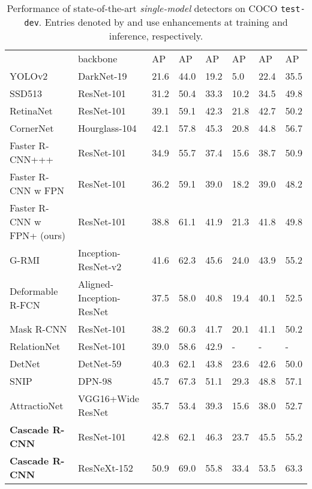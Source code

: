 \documentclass[10pt,journal,compsoc]{IEEEtran}
\newcommand{\bd}[1]{\textbf{#1}}
\newcommand{\tablestyle}[2]{\setlength{\tabcolsep}{#1}\renewcommand{\arraystretch}{#2}\centering\footnotesize}
\begin{document}
\begin{table*}[t]
\tablestyle{3.5pt}{1.1}
\begin{tabular}{l|l|x{22}x{22}x{22}|x{22}x{22}x{22}}
&backbone &AP &AP &AP  &AP &AP &AP\\\shline
YOLOv2 \cite{DBLP:conf/cvpr/RedmonDGF16}       &DarkNet-19 &21.6 &44.0 &19.2  &5.0 &22.4 &35.5\\
SSD513 \cite{DBLP:conf/eccv/LiuAESRFB16}    &ResNet-101 &31.2 &50.4 &33.3  &10.2 &34.5 &49.8\\
RetinaNet \cite{lin2017focal} &ResNet-101  &39.1 &59.1 &42.3  &21.8 &42.7 &50.2\\
CornerNet \cite{DBLP:conf/eccv/LawD18} &Hourglass-104  &42.1 &57.8 &45.3  &20.8 &44.8 &56.7\\\hline
Faster R-CNN+++ \cite{DBLP:conf/cvpr/HeZRS16}      &ResNet-101 &34.9 &55.7 &37.4  &15.6 &38.7 &50.9\\
Faster R-CNN w FPN \cite{lin2017feature}   &ResNet-101 &36.2 &59.1 &39.0  &18.2 &39.0 &48.2\\
Faster R-CNN w FPN+ (ours) &ResNet-101 &38.8 &61.1 &41.9  &21.3 &41.8 &49.8\\
G-RMI \cite{DBLP:journals/corr/HuangRSZKFFWSG016} &Inception-ResNet-v2 &41.6 &62.3 &45.6  &24.0 &43.9 &55.2\\
Deformable R-FCN \cite{dai2017deformable}   &Aligned-Inception-ResNet &37.5 &58.0 &40.8  &19.4 &40.1 &52.5\\
Mask R-CNN \cite{he2017mask}       &ResNet-101 &38.2 &60.3 &41.7  &20.1 &41.1 &50.2\\
RelationNet \cite{hu2018relation} &ResNet-101  &39.0 &58.6 &42.9  &- &- &-\\
DetNet \cite{DBLP:conf/eccv/LiPYZDS18} &DetNet-59   &40.3 &62.1 &43.8  &23.6 &42.6 &50.0\\
SNIP \cite{singh2018analysis} &DPN-98  &45.7 &67.3 &51.1  &29.3 &48.8 &57.1\\\hline
AttractioNet \cite{DBLP:conf/bmvc/GidarisK16} &VGG16+Wide ResNet &35.7 &53.4 &39.3  &15.6 &38.0 &52.7\\
\bd{Cascade R-CNN} &ResNet-101 &42.8 &62.1 &46.3  &23.7 &45.5 &55.2\\
\bd{Cascade R-CNN} &ResNeXt-152 &50.9 &69.0 &55.8  &33.4 &53.5  &63.3\\\hline
\end{tabular}
\vspace{0.1cm}
\caption{Performance of state-of-the-art \emph{single-model} detectors on
COCO \texttt{test-dev}. Entries denoted by  and  use
enhancements at training and inference, respectively.}
\label{tab:state-of-the-art}\vspace{-2mm}
\end{table*}
\end{document}
